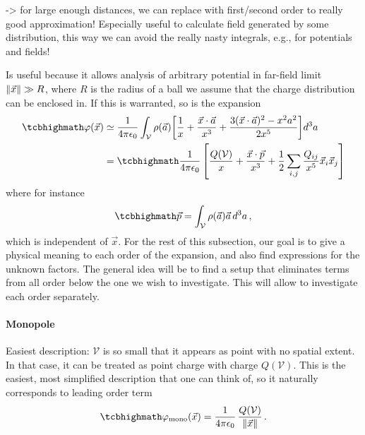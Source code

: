 \documentclass[../class_mech_main.tex]{subfiles}
\DeclareMathOperator{\fpeps}{\frac{1}{4 \pi \epsilon_0}}
\begin{document}

-> for large enough distances, we can replace with first/second order to really good approximation! Especially useful to calculate field generated by some distribution, this way we can avoid the really nasty integrals, e.g., for potentials and fields!


Is useful because it allows analysis of arbitrary potential in far-field limit $\norm{\vec{x}} \gg R$, where $R$ is the radius of a ball we assume that the charge distribution can be enclosed in. If this is warranted, so is the expansion
\begin{align}
    \eqbox{
        \varphi(\vec{x})
    }
    &\simeq \fpeps \int_\mathcal{V} \rho(\vec{a}) \qty[\frac{1}{x} + \frac{\vec{x} \cdot \vec{a}}{x^3} + \frac{3 (\vec{x} \cdot \vec{a})^2 - x^2 a^2}{2 x^5}] d^3a
    \\
    &= 
    \eqbox{
        \fpeps \qty[\frac{Q(\mathcal{V})}{x} + \frac{\vec{x} \cdot \vec{p}}{x^3} + \frac{1}{2} \sum_{i, j} \frac{Q_{ij}}{x^5} \vec{x}_i \vec{x}_j]
    }
\end{align}
where for instance
\begin{equation}
    \eqbox{
        \vec{p} = \int_\mathcal{V} \rho(\vec{a}) \vec{a} \, d^3a
    } \, ,
\end{equation}
which is independent of $\vec{x}$. For the rest of this subsection, our goal is to give a physical meaning to each order of the expansion, and also find expressions for the unknown factors. The general idea will be to find a setup that eliminates terms from all order below the one we wish to investigate. This will allow to investigate each order separately.



            \paragraph{Monopole}
Easiest description: $\mathcal{V}$ is so small that it appears as point with no spatial extent. In that case, it can be treated as point charge with charge $Q(\mathcal{V})$. This is the easiest, most simplified description that one can think of, so it naturally corresponds to leading order term
\begin{equation}
    \eqbox{
        \varphi_\mathrm{mono}(\vec{x}) = \fpeps \frac{Q(\mathcal{V})}{\norm{\vec{x}}}
    } \, .
\end{equation}
\end{document}
